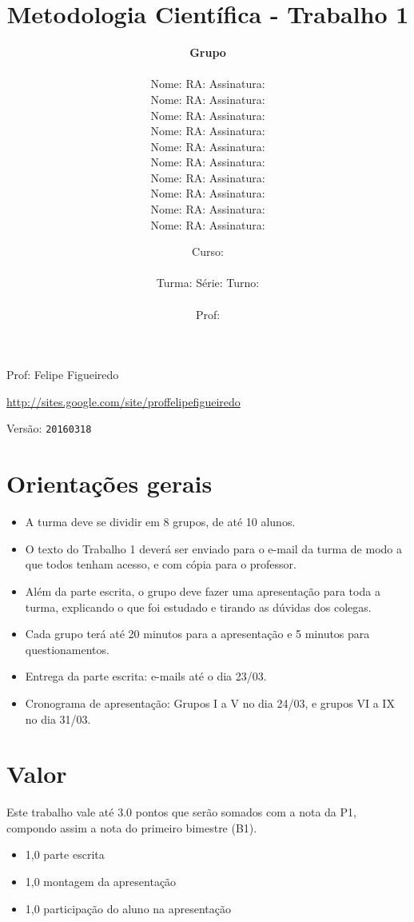 \documentclass[a4paper]{article}
\date{
\bigskip
Curso: \underline{\hspace{8cm}}\\
\ \\
Turma: \underline{\hspace{1cm}} Série: \underline{\hspace{1cm}} Turno:
\underline{\hspace{1cm}}\\
\ \\
Prof: \underline{\hspace{8cm}}\\
}
\title{Metodologia Científica - Trabalho 1}
\author{
{\bf Grupo} \underline{\hspace{1cm}}\\
\ \\
Nome: \underline{\hspace{6cm}} RA: \underline{\hspace{2cm}} Assinatura: \underline{\hspace{4cm}}\\
Nome: \underline{\hspace{6cm}} RA: \underline{\hspace{2cm}} Assinatura: \underline{\hspace{4cm}}\\
Nome: \underline{\hspace{6cm}} RA: \underline{\hspace{2cm}} Assinatura: \underline{\hspace{4cm}}\\
Nome: \underline{\hspace{6cm}} RA: \underline{\hspace{2cm}} Assinatura: \underline{\hspace{4cm}}\\
Nome: \underline{\hspace{6cm}} RA: \underline{\hspace{2cm}} Assinatura: \underline{\hspace{4cm}}\\
Nome: \underline{\hspace{6cm}} RA: \underline{\hspace{2cm}} Assinatura: \underline{\hspace{4cm}}\\
Nome: \underline{\hspace{6cm}} RA: \underline{\hspace{2cm}} Assinatura: \underline{\hspace{4cm}}\\
Nome: \underline{\hspace{6cm}} RA: \underline{\hspace{2cm}} Assinatura: \underline{\hspace{4cm}}\\
Nome: \underline{\hspace{6cm}} RA: \underline{\hspace{2cm}} Assinatura: \underline{\hspace{4cm}}\\
Nome: \underline{\hspace{6cm}} RA: \underline{\hspace{2cm}} Assinatura: \underline{\hspace{4cm}}\\
}
\begin{document}
\newpage

\parbox[c]{.825\textwidth}{\raggedright%
{Prof: Felipe Figueiredo\par}
{\url{http://sites.google.com/site/proffelipefigueiredo}\par}
}

Versão: \verb|20160318|





\section{Orientações gerais}

\begin{itemize}
\item A turma deve se dividir em 8 grupos, de até 10 alunos.
\item O texto do Trabalho 1 deverá ser enviado para o e-mail da turma de modo a que todos tenham acesso, e com cópia para o professor.
\item Além da parte escrita, o grupo deve fazer uma apresentação para toda a turma, explicando o que foi estudado e tirando as dúvidas dos colegas.
\item Cada grupo terá até 20 minutos para a apresentação e 5 minutos para questionamentos.
\item Entrega da parte escrita: e-mails até o dia 23/03.
\item Cronograma de apresentação: Grupos I a V no dia 24/03, e grupos VI a IX no dia 31/03.
\end{itemize}

\section{Valor}
Este trabalho vale até $3.0$ pontos que serão somados com a nota da P1, compondo assim a nota do primeiro bimestre (B1).

\begin{itemize}
\item 1,0 parte escrita
\item 1,0 montagem da apresentação
\item 1,0 participação do aluno na apresentação
\end{itemize}
\end{document}
